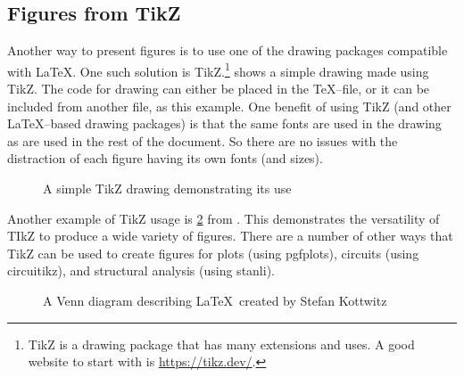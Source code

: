 \subsection{Figures from TikZ} \label{sec:FiguresFromTikZ}
    Another way to present figures is to use one of the drawing packages compatible with \LaTeX.
    One such solution is TikZ.\footnote{TikZ is a drawing package that has many extensions and uses. A good website to start with is \url{https://tikz.dev/}.}
     shows a simple drawing made using TikZ.
    The code for drawing can either be placed in the \TeX--file, or it can be included from another file, as this example.
    One benefit of using TikZ (and other \LaTeX--based drawing packages) is that the same fonts are used in the drawing as are used in the rest of the document.
    So there are no issues with the distraction of each figure having its own fonts (and sizes).
    \begin{figure}
        \centering
        
        \captionsetup{width=2.2in}
        \caption{A simple TikZ drawing demonstrating its use}
        \label{fig:tikz_drawing}
    \end{figure}

    Another example of TikZ usage is \cref{fig:tikz_venn} from \cite{kottwitz2015}.
    This demonstrates the versatility of TIkZ to produce a wide variety of figures.
    There are a number of other ways that TikZ can be used to create figures for plots (using pgfplots), circuits (using circuitikz), and structural analysis (using stanli).
    \begin{figure}
        \centering
        
        \captionsetup{width=2.25in}
        \caption{A Venn diagram describing \LaTeX\ created by Stefan Kottwitz\cite{kottwitz2015}}
        \label{fig:tikz_venn}
    \end{figure}

